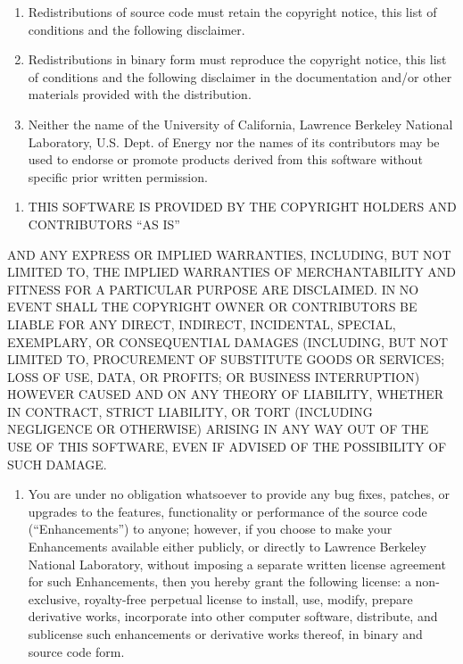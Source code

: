 \begin{enumerate}
\def\labelenumi{(\arabic{enumi})}
\item
  Redistributions of source code must retain the copyright notice, this list of conditions and the following disclaimer.
\item
  Redistributions in binary form must reproduce the copyright notice, this list of conditions and the following disclaimer in the documentation and/or other materials provided with the distribution.
\item
  Neither the name of the University of California, Lawrence Berkeley National Laboratory, U.S. Dept. of Energy nor the names of its contributors may be used to endorse or promote products derived from this software without specific prior written permission. 
\end{enumerate}

\begin{enumerate}
\def\labelenumi{\arabic{enumi}.}
\setcounter{enumi}{1}
\tightlist
\item
  THIS SOFTWARE IS PROVIDED BY THE COPYRIGHT HOLDERS AND CONTRIBUTORS ``AS IS''
\end{enumerate}

AND ANY EXPRESS OR IMPLIED WARRANTIES, INCLUDING, BUT NOT LIMITED TO, THE IMPLIED WARRANTIES OF MERCHANTABILITY AND FITNESS FOR A PARTICULAR PURPOSE ARE DISCLAIMED. IN NO EVENT SHALL THE COPYRIGHT OWNER OR CONTRIBUTORS BE LIABLE FOR ANY DIRECT, INDIRECT, INCIDENTAL, SPECIAL, EXEMPLARY, OR CONSEQUENTIAL DAMAGES (INCLUDING, BUT NOT LIMITED TO, PROCUREMENT OF SUBSTITUTE GOODS OR SERVICES; LOSS OF USE, DATA, OR PROFITS; OR BUSINESS INTERRUPTION) HOWEVER CAUSED AND ON ANY THEORY OF LIABILITY, WHETHER IN CONTRACT, STRICT LIABILITY, OR TORT (INCLUDING NEGLIGENCE OR OTHERWISE) ARISING IN ANY WAY OUT OF THE USE OF THIS SOFTWARE, EVEN IF ADVISED OF THE POSSIBILITY OF SUCH DAMAGE.

\begin{enumerate}
\def\labelenumi{\arabic{enumi}.}
\setcounter{enumi}{2}
\tightlist
\item
  You are under no obligation whatsoever to provide any bug fixes, patches, or upgrades to the features, functionality or performance of the source code (``Enhancements'') to anyone; however, if you choose to make your Enhancements available either publicly, or directly to Lawrence Berkeley National Laboratory, without imposing a separate written license agreement for such Enhancements, then you hereby grant the following license: a non-exclusive, royalty-free perpetual license to install, use, modify, prepare derivative works, incorporate into other computer software, distribute, and sublicense such enhancements or derivative works thereof, in binary and source code form.
\end{enumerate}

